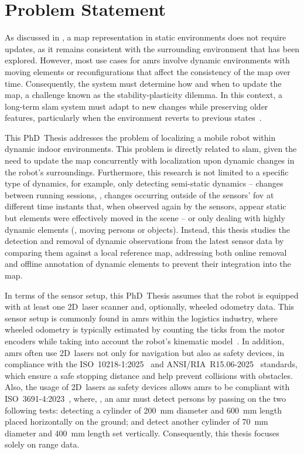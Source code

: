 \section{Problem Statement}\label{sec:intro:problem}

As discussed in ,
a map representation in static environments does not require updates, as it
remains consistent with the surrounding environment that has been explored.
However, most use cases for \glspl{amr} involve dynamic environments with moving
elements or reconfigurations that affect the consistency of the map over time.
Consequently, the system must determine how and when to update the map, a
challenge known as the stability-plasticity dilemma. In this context, a
long-term \gls{slam} system must adapt to new changes while preserving older features,
particularly when the environment reverts to previous
states~\cite{biber-duckett:ijrr:2009}.

This PhD~Thesis addresses the problem of localizing a mobile robot within
dynamic indoor environments. This problem is directly related to \gls{slam},
given the need to update the map concurrently with localization upon
dynamic changes in the robot's surroundings.
Furthermore, this research is not limited to a specific type of dynamics,
for example, only detecting semi-static dynamics --
changes between running sessions, \ie, changes occurring outside of the sensors'
\gls{fov} at different time instants that, when observed again by the sensors,
appear static but elements were effectively moved in the scene -- or only
dealing with highly dynamic elements (\eg, moving persons or objects).
Instead, this thesis studies the detection and removal of dynamic observations
from the latest sensor data by comparing them against a local reference map,
addressing both online removal and offline annotation of dynamic elements
to prevent their integration into the map.

In terms of the sensor setup, this PhD~Thesis assumes that the robot is equipped
with at least one 2D~laser scanner and, optionally, wheeled odometry data.
This sensor setup is commonly found in \glspl{amr} within the logistics
industry, where wheeled odometry is typically estimated by counting the ticks
from the motor encoders while taking into account the robot's kinematic
model~\cite{sousa:jint:2022}.
In addition, \glspl{amr} often use 2D~lasers not only for navigation
but also as safety devices, in compliance with the
ISO~10218-1:2025~\cite{iso-10218-1:2025} and
ANSI/RIA~R15.06-2025~\cite{ansi/ria-r15.06:2025} standards, which ensure a
safe stopping distance and help prevent collisions with obstacles.
Also, the usage of 2D~lasers as safety devices allows \glspl{amr} to be
compliant with ISO~3691-4:2023~\cite{iso-3691-4:2023}, where, \eg,
an \gls{amr} must detect persons by passing on the two following
tests: detecting a cylinder of 200~mm diameter and 600~mm length placed
horizontally on the ground; and detect another cylinder of 70~mm diameter and
400~mm length set vertically.
Consequently, this thesis focuses solely on range data.

